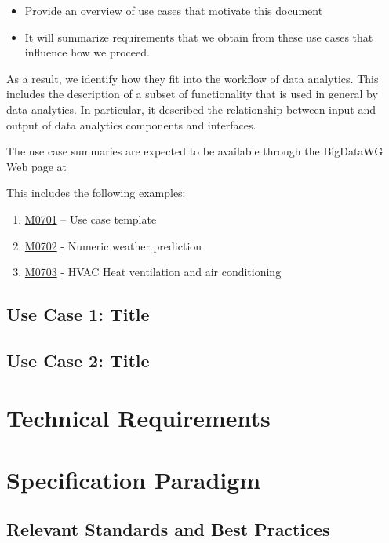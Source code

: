 \documentclass[12pt]{article}
\begin{document}
\begin{itemize}
\item	Provide an overview of use cases that motivate this document
\item	It will summarize requirements that we obtain from these use cases that influence how we proceed.
\end{itemize}

As a result, we identify how they fit into the workflow of data analytics. This includes the description of a subset of functionality that is used in general by data analytics.  In particular, it described the relationship between input and output of data analytics components and interfaces. 

The use case summaries are expected to be available through the BigDataWG Web page at 


This includes the following examples:

\begin{enumerate}
\item	\href{https://bigdatawg.nist.gov/_uploadfiles/M0701_v1_2020102001.docx}{M0701} – Use case template
\item	\href{https://bigdatawg.nist.gov/_uploadfiles/M0702_v1_2020102002.pdf}{M0702} - Numeric weather prediction
\item	\href{https://bigdatawg.nist.gov/_uploadfiles/M0703_v1_2020102003.pdf}{M0703} - HVAC Heat ventilation and air conditioning 
\end{enumerate}



\subsection{Use Case 1: Title}
\subsection{Use Case 2: Title}


\section{Technical Requirements}

\section{Specification Paradigm}

\subsection{Relevant Standards and Best Practices}
\end{document}
